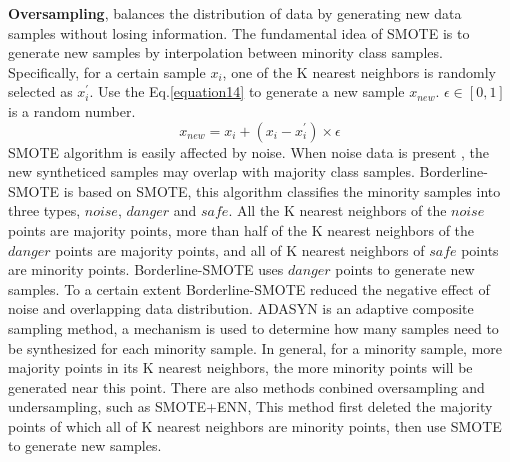 \documentclass[runningheads]{llncs}
\begin{document}
\textbf{Oversampling}, balances the distribution of data 
by generating new data samples without losing information.
The fundamental idea of SMOTE is to generate new samples by interpolation between minority class samples\cite{2018SMOTE}.
Specifically, for a certain sample $x_i$, one of the K nearest neighbors is randomly selected as $x_i ^{'}$.
Use the Eq.\ref{equation14} to generate a new sample $x_{new}$. $\epsilon \in [0,1]$ is a random number.
\begin{equation}
  \label{equation14}
  x_{new}=x_i+(x_i-x_i^{'})\times \epsilon
\end{equation}
 SMOTE algorithm is easily affected by noise.
When noise data is present
, the new syntheticed samples may overlap with majority class samples.
Borderline-SMOTE\cite{2005Borderline} is based on SMOTE, this algorithm classifies
the minority samples into three types, 
$noise$, $danger$ and $safe$.
All the K nearest neighbors of the $noise$ points are majority points, 
more than half of the K nearest neighbors 
of the $danger$ points are majority points, 
and all of K nearest neighbors of $safe$ points are minority points.
Borderline-SMOTE uses $danger$ points to generate new samples.
To a certain extent Borderline-SMOTE reduced the negative effect of noise and overlapping data distribution.
ADASYN\cite{2008ADASYN} is an adaptive composite sampling method, 
a mechanism is used to determine how many samples need to be synthesized for each minority sample.
In general, for a minority sample, more majority points in its K nearest neighbors, 
the more minority points will be generated near this point.
There are also methods conbined oversampling and undersampling, such as SMOTE+ENN\cite{2019Electrocardiogram},
This method first deleted the majority points of which all of K nearest neighbors are minority points,
then use SMOTE to generate new samples.
\end{document}
